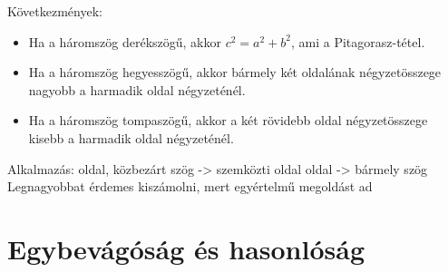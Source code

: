 \documentclass[twoside,12pt]{report}
\theoremstyle{definition}
\begin{document}
	Következmények:
	\begin{itemize}
		\item Ha a háromszög derékszögű, akkor $c^2=a^2+b^2$, ami a Pitagorasz-tétel.
		\item Ha a háromszög hegyesszögű, akkor bármely két oldalának négyzetösszege nagyobb a harmadik oldal négyzeténél.
		\item Ha a háromszög tompaszögű, akkor a két rövidebb oldal négyzetösszege kisebb a harmadik oldal négyzeténél.
	\end{itemize}
	\begin{outline}
		\1 Alkalmazás:
			 oldal, közbezárt szög -> szemközti oldal
			 oldal -> bármely szög
				\3 Legnagyobbat érdemes kiszámolni, mert egyértelmű megoldást ad
	\end{outline}
\chapter{Egybevágóság és hasonlóság}
\end{document}

